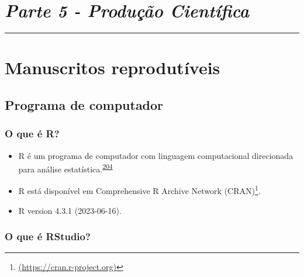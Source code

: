 \documentclass[
  a4paper,
]{book}
\renewcommand{\href}[2]{#2\footnote{\url{#1}}}
\begin{document}

\hypertarget{parte-5---produuxe7uxe3o-cientuxedfica}{%
\chapter*{\texorpdfstring{\emph{Parte 5 - Produção Científica}}{Parte 5 - Produção Científica}}\label{parte-5---produuxe7uxe3o-cientuxedfica}}

\markboth{}{}
\par\noindent\rule{\textwidth}{0.05in}

\hypertarget{manuscritos-reprodutiveis}{%
\chapter{\texorpdfstring{\textbf{Manuscritos reprodutíveis}}{Manuscritos reprodutíveis}}\label{manuscritos-reprodutiveis}}

\hypertarget{inicio}{%
\section{Programa de computador}\label{inicio}}

\hypertarget{o-que-uxe9-r}{%
\subsection{O que é R?}\label{o-que-uxe9-r}}

\begin{itemize}
\item
  R é um programa de computador com linguagem computacional direcionada para análise estatística.\textsuperscript{\protect\hyperlink{ref-ihaka1996}{204}}
\item
  R está disponível em \href{(https://cran.r-project.org)}{Comprehensive R Archive Network (CRAN)}.
\item
  R version 4.3.1 (2023-06-16).
\end{itemize}

\hypertarget{o-que-uxe9-rstudio}{%
\subsection{O que é RStudio?}\label{o-que-uxe9-rstudio}}
\end{document}

